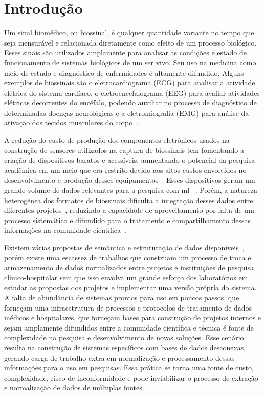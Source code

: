 \chapter{Introdução}\label{cap:introducao}

Um sinal biomédico, ou biossinal, é qualquer quantidade variante no tempo que seja mensurável e relacionada diretamente como efeito de um processo biológico. Esses sinais são utilizados amplamente para analisar as condições e estado de funcionamento de sistemas biológicos de um ser vivo. Seu uso na medicina como meio de estudo e diagnóstico de enfermidades é altamente difundido. Alguns exemplos de biossinais são o eletrocardiograma (ECG) para analisar a atividade elétrica do sistema cardíaco, o eletroencefalograma (EEG) para avaliar atividades elétricas decorrentes do encéfalo, podendo auxiliar no processo de diagnóstico de determinadas doenças neurológicas e a eletromiografia (EMG) para análise da ativação dos tecidos musculares do corpo~\cite{BiosignalsAndCompressionStandards}.

A redução do custo de produção dos componentes eletrônicos usados na construção de sensores utilizados na captura de biossinais tem fomentando a criação de dispositivos baratos e acessíveis, aumentando o potencial da pesquisa acadêmica em um meio que era restrito devido aos altos custos envolvidos no desenvolvimento e produção desses equipamentos~\cite{StorageofBiomedicalSignals}. Esses dispositivos geram um grande volume de dados relevantes para a pesquisa com \gls{ml}  ~\cite{ResponsibleandRegulatoryConformMachineLearning}. Porém, a natureza heterogênea dos formatos de biossinais dificulta a integração desses dados entre diferentes projetos~\cite{ExtensibleBiosignalMetadata}, reduzindo a capacidade de aproveitamento por falta de um processo sistemático e difundido para o tratamento e compartilhamento dessas informações na comunidade científica~\cite{Thurk2016,Varri2001}.

Existem várias propostas de semântica e estruturação de dados disponíveis~\cite{StorageBIT,BioSignalMLMetaModel}, porém existe uma escassez de trabalhos que construam um processo de troca e armazenamento de dados normalizados entre projetos e instituições de pesquisa clínico-hospitalar sem que isso envolva um grande esforço dos laboratórios em estudar as propostas dos projetos e implementar uma versão própria do sistema. A falta de abundância de sistemas prontos para uso em poucos passos, que forneçam uma infraestrutura de processos e protocolos de tratamento de dados médicos e hospitalares, que forneçam bases para construção de projetos internos e sejam amplamente difundidos entre a comunidade científica e técnica é fonte de complexidade na pesquisa e desenvolvimento de novas soluções. Esse cenário resulta na construção de sistemas específicos com bases de dados desconexas, gerando carga de trabalho extra em normalização e processamento dessas informações para o uso em pesquisas. Essa prática se torna uma fonte de custo, complexidade, risco de inconformidade e pode inviabilizar o processo de extração e normalização de dados de múltiplas fontes.

